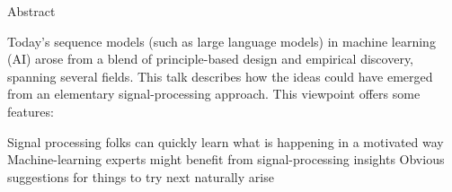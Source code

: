 \begin{slide}[\slideopts,toc={}]{Abstract}

Today's sequence models (such as large language models) in machine
learning (AI) arose from a blend of principle-based design and
empirical discovery, spanning several fields.
\maybepause
This talk describes how the ideas could have emerged from an elementary signal-processing
approach.
\maybepause
This viewpoint offers some features:
\begin{enumerate}
\mpitem Signal processing folks can quickly learn what is happening in a motivated way
\mpitem Machine-learning experts might benefit from signal-processing insights
\mpitem Obvious suggestions for things to try next naturally arise
\end{enumerate}



\end{slide}
